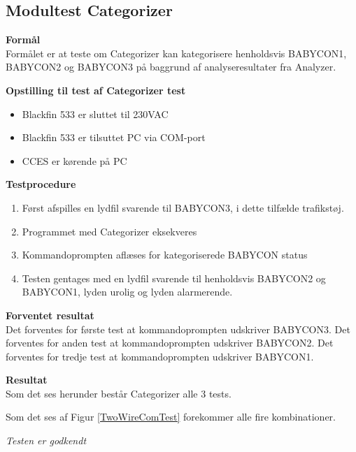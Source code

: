 \subsection{Modultest Categorizer}

\textbf{Formål} \\
Formålet er at teste om Categorizer kan kategorisere henholdsvis BABYCON1, BABYCON2 og BABYCON3 på baggrund af analyseresultater fra Analyzer.

\textbf{Opstilling til test af Categorizer test}

\begin{itemize}
	\item Blackfin 533 er sluttet til 230VAC
	\item Blackfin 533 er tilsuttet PC via COM-port
	\item CCES er kørende på PC
\end{itemize}

\textbf{Testprocedure}
\begin{enumerate}
	\item Først afspilles en lydfil svarende til BABYCON3, i dette tilfælde trafikstøj.
	\item Programmet med Categorizer eksekveres 
	\item Kommandoprompten aflæses for kategoriserede BABYCON status
	\item Testen gentages med en lydfil svarende til henholdsvis BABYCON2 og BABYCON1, lyden urolig og lyden alarmerende. 
\end{enumerate}

\textbf{Forventet resultat} \\
Det forventes for første test at kommandoprompten udskriver BABYCON3.
Det forventes for anden test at kommandoprompten udskriver BABYCON2.
Det forventes for tredje test at kommandoprompten udskriver BABYCON1. 

\textbf{Resultat} \\
Som det ses herunder består Categorizer alle 3 tests. 


Som det ses af Figur \ref{TwoWireComTest} forekommer alle fire kombinationer. \\



\textit{Testen er godkendt}